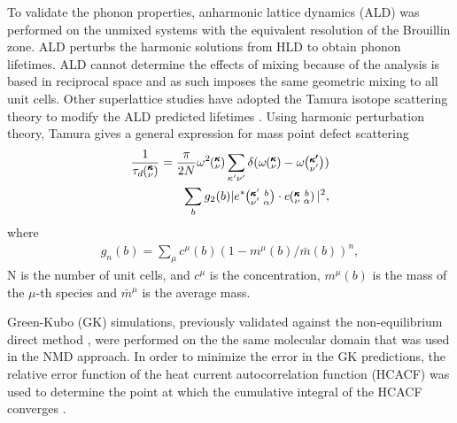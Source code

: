 \documentclass[aps,prb,preprint,preprintnumbers,amsmath,amssymb,floatfix,superscriptaddress]{revtex4}
\newcommand{\kvba}{\mspace{-4.0mu}\left(\mspace{-8.0mu}
\begin{smallmatrix} &\pmb{\kappa} &b \\ &\nu &\alpha\end{smallmatrix}
\mspace{-3.0mu}\right)}
\newcommand{\kvbap}{\mspace{-4.0mu}\left(\mspace{-8.0mu}
\begin{smallmatrix} &\pmb{\kappa}' &b \\ &\nu' &\alpha\end{smallmatrix}
\mspace{-3.0mu}\right)}
\newcommand{\kv}{\mspace{-4.0mu}\left(\mspace{-8.0mu}
\begin{smallmatrix}&\pmb{\kappa} \\&\nu\end{smallmatrix}
\mspace{-3.0mu}\right)}
\newcommand{\kvp}{\mspace{-4.0mu}\left(\mspace{-8.0mu}
\begin{smallmatrix}&\pmb{\kappa'} \\&\nu'\end{smallmatrix}
\mspace{-3.0mu}\right)}
\begin{document}
To validate the phonon properties, anharmonic lattice dynamics \cite{PhysRevB.79.064301} (ALD) was performed on the unmixed systems with the equivalent resolution of the Brouillin zone. ALD perturbs the harmonic solutions from HLD to obtain phonon lifetimes. ALD cannot determine the effects of mixing because of the analysis is based in reciprocal space and as such imposes the same geometric mixing to all unit cells. Other superlattice studies \cite{Luckyanova16112012} have adopted the Tamura isotope scattering theory to modify the ALD predicted lifetimes \cite{Tamura 83}. Using harmonic perturbation theory, Tamura gives a general expression  for mass point defect scattering\cite{tamura_isotope_1983}
\begin{equation}\label{EQ:tau_d}
\begin{split}
\frac{1}{\tau_{d}\kv} = \frac{\pi}{2N}\omega^2\kv 
\sum_{\mathbf{\kappa'}\nu'} \delta( \omega\kv - 
\omega\kvp ) \\
\sum_{b} g_2(b) 
|e^*\kvbap \cdot e\kvba |^2 ,
\end{split}
\end{equation}
where 
\begin{equation}\label{EQ:g(b)}
\begin{split}
g_n(b) = \sum_\mu c^{\mu}(b)(1-m^{\mu}(b)/\bar{m}(b))^n, 
\end{split}
\end{equation}
N is the number of unit cells, and $c^\mu$ is the concentration, $m^\mu(b)$ is the mass of the $\mu$-th species and $\bar{m}^{\mu}$ is the average mass. 

Green-Kubo (GK) simulations, previously validated against the non-equilibrium direct method \cite {PhysRevB.79.075316}, were performed on the the same molecular domain that was used in the NMD approach. In order to minimize the error in the GK predictions, the relative error function of the heat current autocorrelation function (HCACF) was used to determine the point at which the cumulative integral of the HCACF converges \cite{Chen20102392}.
\end{document}

